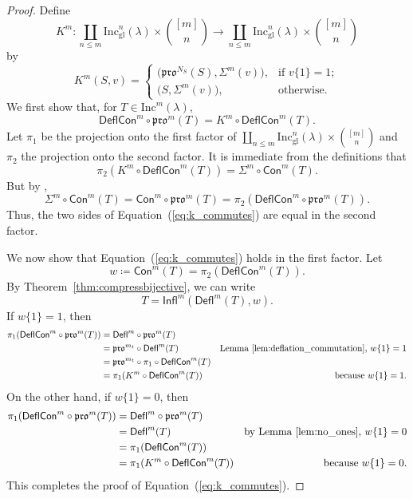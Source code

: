 \documentclass[12pt]{amsart}
\theoremstyle{definition}
\theoremstyle{remark}
\numberwithin{equation}{section}
\newcommand{\inc}{\ensuremath{\mathrm{Inc}}}
\newcommand{\incgl}{\inc_{\mathrm{gl}}}
\newcommand{\pro}{\mathfrak{pro}}
\newcommand{\deflate}{\ensuremath{\mathsf{Defl}}}
\newcommand{\tinflate}{\ensuremath{\mathsf{Infl}}}
\newcommand{\content}{\ensuremath{\mathsf{Con}}}
\newcommand{\compress}{\ensuremath{\mathsf{DeflCon}}}
\begin{document}
  \begin{proof}
Define
  \[
  K^m: \coprod_{n \leq m}\incgl^n(\lambda) \times \binom{[m]}{n} \rightarrow \coprod_{n \leq m}\incgl^n(\lambda) \times \binom{[m]}{n}
  \] by
\[
K^m(S,v) =
\begin{cases}
    \big( \pro^{N_S}(S),\Sigma^m(v) \big),  & \text{if } v\{1\} = 1; \\        
   \big( S,\Sigma^m(v) \big), & \text{otherwise.}
\end{cases}
\]
We first show that, for $T \in \inc^m(\lambda)$,
\begin{equation}\label{eq:k_commutes}
\compress^m \circ \pro^m(T) = K^m \circ \compress^m(T).
\end{equation}
Let $\pi_1$ be the projection onto the first factor of $\coprod_{n \leq m}\incgl^n(\lambda) \times \binom{[m]}{n}$ and $\pi_2$ the projection onto the second factor. It is immediate from the definitions that \[ \pi_2(K^m \circ \compress^m(T)) = \Sigma^m \circ \content^m(T).\] But by \cite[Lemma~2.1]{DPS},
\[  \Sigma^m \circ \content^m(T) = \content^m \circ \pro^m(T) = \pi_2(\compress^m \circ \pro^m(T)).\] Thus, the two sides of Equation~(\ref{eq:k_commutes}) are equal in the second factor.  

We now show that Equation~(\ref{eq:k_commutes}) holds in the first factor. Let \[ w \coloneqq \content^m(T) = \pi_2(\compress^m(T)). \]  By Theorem~\ref{thm:compressbijective}, we can write
\[ T = \tinflate^m(\deflate^m(T), w).\] 
If $w\lbrace 1 \rbrace = 1 $, then
\begin{align*}
\pi_1(\compress^m \circ \pro^m(T)) &= \deflate^m \circ \pro^m(T) \\
&= \pro^{m_t} \circ \deflate^m (T) &\text{Lemma~\ref{lem:deflation_commutation}, $w\lbrace 1 \rbrace = 1$} \\
&= \pro^{m_t} \circ \pi_1 \circ \compress^m(T) \\ 
&= \pi_1(K^m \circ \compress^m(T)) &\text{because $w\lbrace 1 \rbrace = 1$.}
\end{align*}
On the other hand, if $w \lbrace 1 \rbrace = 0$, then 
\begin{align*}
\pi_1(\compress^m \circ \pro^m(T)) &= \deflate^m \circ \pro^m(T) \\
&= \deflate^m(T) &\text{by Lemma~\ref{lem:no_ones}, $w \lbrace 1 \rbrace = 0$} \\
&= \pi_1 ( \compress^m(T) ) \\
&= \pi_1 ( K^m \circ \compress^m(T)) &\text{because $w\lbrace 1 \rbrace = 0$.}
\end{align*}
This completes the proof of Equation~(\ref{eq:k_commutes}).


\end{proof}
\end{document}
